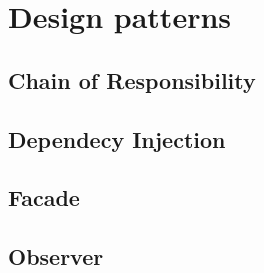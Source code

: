 \newpage
\section{Design patterns}
\subsection{Chain of Responsibility}
\subsection{Dependecy Injection}
\subsection{Facade}
\subsection{Observer}
